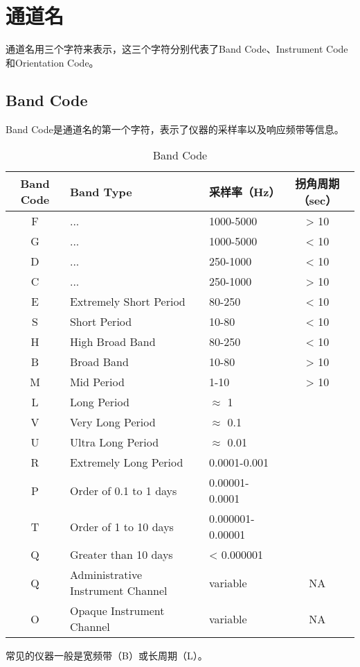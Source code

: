 \section{通道名}
通道名用三个字符来表示，这三个字符分别代表了Band Code、Instrument Code
和Orientation Code。

\subsection{Band Code}
Band Code是通道名的第一个字符，表示了仪器的采样率以及响应频带等信息。

\begin{table}[H]
\centering\small
\caption{Band Code}
\label{tbl:bandcode}
\begin{tabular}{cllc}
\toprule
Band Code   &   Band Type   &   采样率（\si{Hz}） & 拐角周期（sec） \\
\midrule
F           &   ...         &   1000-5000   &     > 10    \\
G           &   ...         &   1000-5000   &     < 10    \\
D           &   ...         &   250-1000    &     < 10    \\
C           &   ...         &   250-1000    &     > 10    \\
E           &   Extremely Short Period  & 80-250    &     < 10    \\
S           &   Short Period          & 10-80   & < 10    \\
H           &   High Broad Band         &   80-250    &   < 10    \\
B           &   Broad Band          &   10-80   & > 10    \\
M           &   Mid Period          &   1-10   & > 10    \\
L           &   Long Period         &   $\approx$ 1   &   \\
V           &   Very  Long Period         & $\approx$ 0.1   &   \\
U           &   Ultra Long Period         & $\approx$ 0.01    &   \\
R           &   Extremely Long Period     & 0.0001-0.001    &   \\
P           &   Order of 0.1 to 1 days   & 0.00001-0.0001    &   \\
T           &   Order of 1 to 10 days    & 0.000001-0.00001    &   \\
Q           &   Greater than 10 days          &     < 0.000001    &   \\
Q           &   Administrative Instrument Channel   & variable    & NA    \\
O           &   Opaque Instrument Channel         & variable    &   NA    \\
\bottomrule
\end{tabular}
\end{table}
常见的仪器一般是宽频带（B）或长周期（L）。

